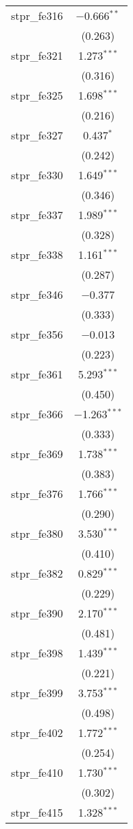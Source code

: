 \begin{table}[!htbp]
\begin{tabular}{@{\extracolsep{5pt}}lc}
  stpr\_fe316 & $-$0.666$^{**}$ \\ 
  & (0.263) \\ 
  stpr\_fe321 & 1.273$^{***}$ \\ 
  & (0.316) \\ 
  stpr\_fe325 & 1.698$^{***}$ \\ 
  & (0.216) \\ 
  stpr\_fe327 & 0.437$^{*}$ \\ 
  & (0.242) \\ 
  stpr\_fe330 & 1.649$^{***}$ \\ 
  & (0.346) \\ 
  stpr\_fe337 & 1.989$^{***}$ \\ 
  & (0.328) \\ 
  stpr\_fe338 & 1.161$^{***}$ \\ 
  & (0.287) \\ 
  stpr\_fe346 & $-$0.377 \\ 
  & (0.333) \\ 
  stpr\_fe356 & $-$0.013 \\ 
  & (0.223) \\ 
  stpr\_fe361 & 5.293$^{***}$ \\ 
  & (0.450) \\ 
  stpr\_fe366 & $-$1.263$^{***}$ \\ 
  & (0.333) \\ 
  stpr\_fe369 & 1.738$^{***}$ \\ 
  & (0.383) \\ 
  stpr\_fe376 & 1.766$^{***}$ \\ 
  & (0.290) \\ 
  stpr\_fe380 & 3.530$^{***}$ \\ 
  & (0.410) \\ 
  stpr\_fe382 & 0.829$^{***}$ \\ 
  & (0.229) \\ 
  stpr\_fe390 & 2.170$^{***}$ \\ 
  & (0.481) \\ 
  stpr\_fe398 & 1.439$^{***}$ \\ 
  & (0.221) \\ 
  stpr\_fe399 & 3.753$^{***}$ \\ 
  & (0.498) \\ 
  stpr\_fe402 & 1.772$^{***}$ \\ 
  & (0.254) \\ 
  stpr\_fe410 & 1.730$^{***}$ \\ 
  & (0.302) \\ 
  stpr\_fe415 & 1.328$^{***}$ \\ 

\end{tabular}
\end{table}
